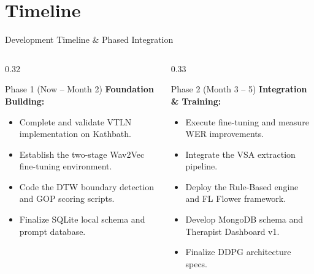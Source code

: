 \documentclass[aspectratio=169, 11pt, xcolor=table]{beamer}
\begin{document}
\section{Timeline}
\begin{frame}{Development Timeline \& Phased Integration}
    \vspace{-2mm}
    \begin{columns}[T]
        \begin{column}{0.32\textwidth}
            \begin{block}{\scriptsize Phase 1 (Now -- Month 2)}
                \scriptsize
                \textbf{Foundation Building:}
                \begin{itemize}
                    \item Complete and validate VTLN implementation on Kathbath.
                    \item Establish the two-stage Wav2Vec fine-tuning environment.
                    \item Code the DTW boundary detection and GOP scoring scripts.
                    \item Finalize SQLite local schema and prompt database.
                \end{itemize}
            \end{block}
        \end{column}

        \begin{column}{0.33\textwidth}
            \begin{block}{\scriptsize Phase 2 (Month 3 -- 5)}
                \scriptsize
                \textbf{Integration \& Training:}
                \begin{itemize}
                    \item Execute fine-tuning and measure WER improvements.
                    \item Integrate the VSA extraction pipeline.
                    \item Deploy the Rule-Based engine and FL Flower framework.
                    \item Develop MongoDB schema and Therapist Dashboard v1.
                    \item Finalize DDPG architecture specs.
                \end{itemize}
            \end{block}
        \end{column}


\end{columns}
\end{frame}
\end{document}
